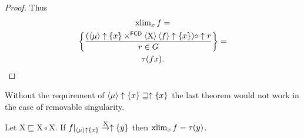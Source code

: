 \begin{proof}
Thus
\begin{multline*}
\operatorname{xlim}_{x}f= \\ \left\{ \frac{(\left\langle \mu\right\rangle\uparrow\{x\}\times^{\mathsf{FCD}}\left\langle \mathrm{X}\right\rangle\left\langle f\right\rangle\uparrow\{x\})\circ\uparrow r}{r\in G}\right\}= \\ \tau(fx).
\end{multline*}
\end{proof}
\begin{rem}
Without the requirement of $\left\langle \mu\right\rangle\uparrow\{x\}\sqsupseteq\uparrow\{x\}$
the last theorem would not work in the case of removable singularity.\end{rem}
\begin{thm}
Let $\mathrm{X}\sqsubseteq\mathrm{X}\circ\mathrm{X}$. If $f|_{\left\langle \mu\right\rangle\uparrow\{x\}}\overset{\mathrm{X}}{\rightarrow}\uparrow\{y\}$
then $\operatorname{xlim}_{x}f=\tau(y)$.\end{thm}


